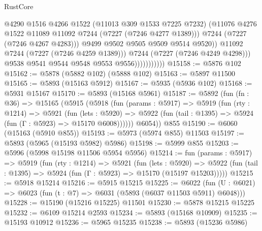 \begin{lexlean}{RustCore}
\begin{coremodule}
                                    @4290
                                    @1516
                                    @4266
                                    @1522
                                    (@11013 @309 @1533 @7225 @7232)
                                    (@11076
                                      @4276
                                      @1522
                                      @11089
                                      @11092
                                      @7244
                                      (@7227 (@7246 @4277 @1389)))
                                    @7244
                                    (@7227 (@7246 @4267 @4283)))
                                  @9499
                                  @9502
                                  @9505
                                  @9509
                                  @9514
                                  @9520))
                              @11092
                              @7244
                              (@7227 (@7246 @4259 @1389)))
                            @7244
                            (@7227 (@7246 @4249 @4298)))
                          @9538
                          @9541
                          @9544
                          @9548
                          @9553
                          @9556)))))))))))
@15158 := @5876 @102
@15162 := @5878 (@5882 @102) (@5888 @102)
@15163 := @5897 @11500
@15165 := @5893 (@15163 @5912)
@15167 := @5935 (@5936 @102)
@15168 := @5931 @15167
@15170 := @5893 (@15168 @5961)
@15187 := @5892
    (fun (fn : @36) =>
    @15165
      (@5915
        (@5918
          (fun (params : @5917) =>
          @5919
            (fun (rty : @1214) =>
            @5921
              (fun (lets : @5920) =>
              @5922 (fun (tail : @1395) => @5924 (fun (Γ : @5923) => @15170 @6008))))))
        @6054))
    @855
@15190 := @6060 (@15163 (@5910 @855))
@15193 := @5973 (@5974 @855) @11503
@15197 := @5893 (@5965 (@15193 @5982) @5986)
@15198 := @5999 @855
@15203 := @5996 (@5998 @15198 @11506 @5954 @5956)
@15214 := fun (params : @5917) =>
  @5919
    (fun (rty : @1214) =>
    @5921
      (fun (lets : @5920) =>
      @5922 (fun (tail : @1395) => @5924 (fun (Γ : @5923) => @15170 (@15197 @15203)))))
@15215 := @5918 @15214
@15216 := @5915 @15215
@15225 := @6022
    (fun (U : @6021) => @6023 (fun (t : @7) => @6031 (@5893 (@6037 @11503 @5911) @6048)))
@15228 := @15190 (@15216 @15225) @11501
@15230 := @5878 @15215 @15225
@15232 := @6109 @15214 @2593
@15234 := @5893 (@15168 @10909)
@15235 := @15193 @10912
@15236 := @5965 @15235
@15238 := @5893 (@15236 @5986)

\end{coremodule}
\end{lexlean}
